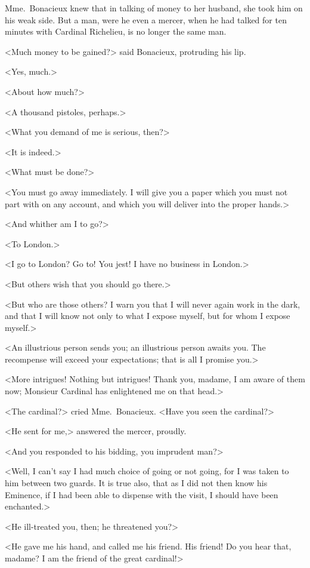 Mme.~Bonacieux knew that in talking of money to her husband, she took him on his weak side. But a man, were he even a mercer, when he had talked for ten minutes with Cardinal Richelieu, is no longer the same man. 

<Much money to be gained?> said Bonacieux, protruding his lip. 

<Yes, much.> 

<About how much?> 

<A thousand pistoles, perhaps.> 

<What you demand of me is serious, then?> 

<It is indeed.> 

<What must be done?> 

<You must go away immediately. I will give you a paper which you must not part with on any account, and which you will deliver into the proper hands.> 

<And whither am I to go?> 

<To London.> 

<I go to London? Go to! You jest! I have no business in London.> 

<But others wish that you should go there.> 

<But who are those others? I warn you that I will never again work in the dark, and that I will know not only to what I expose myself, but for whom I expose myself.> 

<An illustrious person sends you; an illustrious person awaits you. The recompense will exceed your expectations; that is all I promise you.> 

<More intrigues! Nothing but intrigues! Thank you, madame, I am aware of them now; Monsieur Cardinal has enlightened me on that head.> 

<The cardinal?> cried Mme.~Bonacieux. <Have you seen the cardinal?> 

<He sent for me,> answered the mercer, proudly. 

<And you responded to his bidding, you imprudent man?> 

<Well, I can't say I had much choice of going or not going, for I was taken to him between two guards. It is true also, that as I did not then know his Eminence, if I had been able to dispense with the visit, I should have been enchanted.> 

<He ill-treated you, then; he threatened you?> 

<He gave me his hand, and called me his friend. His friend! Do you hear that, madame? I am the friend of the great cardinal!> 

